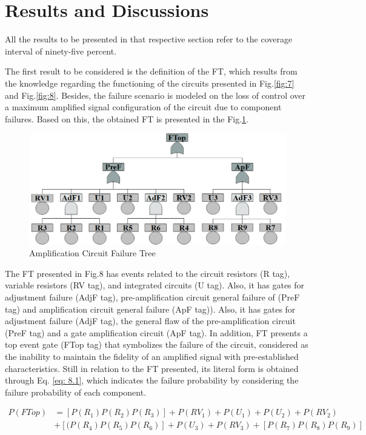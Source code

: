 \documentclass{ws-m3as}
\begin{document}
\section{Results and Discussions}

All the results to be presented in that respective section refer to the coverage interval of ninety-five percent.

The first result to be considered is the definition of the FT, which results from the knowledge regarding the functioning of the circuits presented in Fig.\ref{fig:7} and Fig.\ref{fig:8}. Besides, the failure scenario is modeled on the loss of control over a maximum amplified signal configuration of the circuit due to component failures. Based on this, the obtained FT is presented in the Fig.\ref{fig:9}.

\begin{figure}[H]
	\centering  
	\includegraphics[width=0.95\linewidth]{Figures/FaultTree}
	\caption{Amplification Circuit Failure Tree}
	\label{fig:9}
\end{figure}

The FT presented in Fig.8 has events related to the circuit resistors (R tag), variable resistors (RV tag), and integrated circuits (U tag). Also, it has gates for adjustment failure (AdjF tag), pre-amplification circuit general failure of (PreF tag) and amplification circuit general failure (ApF tag)). Also, it has gates for adjustment failure (AdjF tag), the general flaw of the pre-amplification circuit (PreF tag) and a gate amplification circuit (ApF tag). In addition, FT presents a top event gate (FTop tag) that symbolizes the failure of the circuit, considered as the inability to maintain the fidelity of an amplified signal with pre-established characteristics. Still in relation to the FT presented, its literal form is obtained through Eq. \ref {eq: 8.1}, which indicates the failure probability by considering the failure probability of each component.

\begin{equation} \label{eq:8.1}
\begin{split}
P(FTop) & =[P(R_{1})P(R_{2})P(R_{3})]+P(RV_{1})+P(U_{1})+P(U_{2})+P(RV_{2})\\
&+[(P(R_{4})P(R_{5})P(R_{6})]+P(U_{3})+P(RV_{3})+[P(R_{7})P(R_{8})P(R_{9})]
\end{split}
\end{equation}
\hspace{2pt}
\end{document}
